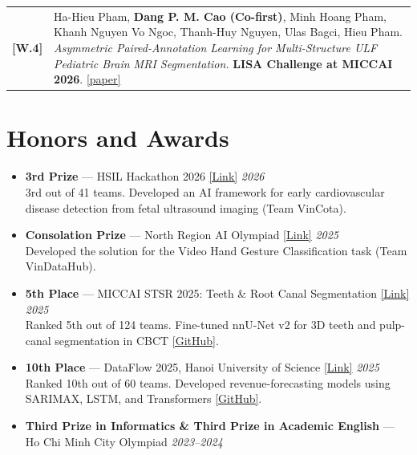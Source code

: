 \documentclass[a4paper,10pt]{article}
\makeatletter
\newcommand{\honorEntry}[4]{%
  \item
  \noindent
  \textbf{#1} --- #2
  \hfill \textit{#3}\\[-1pt]
  {\small #4}
}
\newcommand{\smalllink}[2]{\href{#1}{\textcolor{linkblue}{#2}}}
\newcommand{\pub}[2]{%
  \noindent\begin{tabularx}{\textwidth}{@{}p{0.055\textwidth} X@{}}
    \textbf{[#1]} & #2
  \end{tabularx}\vspace{0.38em}
}
\makeatother
\begin{document}
\pub{W.4}{
Ha-Hieu Pham, \textbf{Dang P. M. Cao (Co-first)}, Minh Hoang Pham, Khanh Nguyen Vo Ngoc,
Thanh-Huy Nguyen, Ulas Bagci, Hieu Pham.
\textit{Asymmetric Paired-Annotation Learning for Multi-Structure ULF Pediatric Brain MRI Segmentation.}
\textbf{LISA Challenge at MICCAI 2026}. \smalllink{https://arxiv.org/pdf/2609.02210}{[paper]}
}

\section{Honors and Awards}

\begin{itemize}

  \honorEntry
    {3rd Prize}
    {HSIL Hackathon 2026
    \smalllink{https://hsph.harvard.edu/research/health-systems-innovation-lab/work/hsil-hackathon-2026-building-high-value-health-systems-leveraging-ai/}{[Link]}}
    {2026}
    {3rd out of 41 teams. Developed an AI framework for early cardiovascular disease detection from fetal ultrasound imaging (Team VinCota).}

  \honorEntry
    {Consolation Prize}
    {North Region AI Olympiad
    \smalllink{https://www.olp.vn/olympic-ai-sinh-vi\%C3\%AAn}{[Link]}}
    {2025}
    {Developed the solution for the Video Hand Gesture Classification task (Team VinDataHub).}

  \honorEntry
    {5th Place}
    {MICCAI STSR 2025: Teeth \& Root Canal Segmentation
    \smalllink{https://www.codabench.org/competitions/6468/}{[Link]}}
    {2025}
    {Ranked 5th out of 124 teams. Fine-tuned nnU-Net v2 for 3D teeth and pulp-canal segmentation in CBCT
    \smalllink{https://github.com/minhdang-DS/MICCAI-2025-Tooth-Segmentation-Challenge}{[GitHub]}.}

  \honorEntry
    {10th Place}
    {DataFlow 2025, Hanoi University of Science
    \smalllink{http://mim.hus.vnu.edu.vn/dataflow/}{[Link]}}
    {2025}
    {Ranked 10th out of 60 teams. Developed revenue-forecasting models using SARIMAX, LSTM, and Transformers
    \smalllink{https://github.com/dinhieufam/Forecasting-Business-Performance/tree/master}{[GitHub]}.}

  \honorEntry
    {Third Prize in Informatics \& Third Prize in Academic English}
    {Ho Chi Minh City Olympiad}
    {2023--2024}
    {}

\end{itemize}
\end{document}
